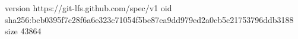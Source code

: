version https://git-lfs.github.com/spec/v1
oid sha256:bcb0395f7c28f6a6e323c71054f5be87ea9dd979ed2a0cb5c21753796ddb3188
size 43864
